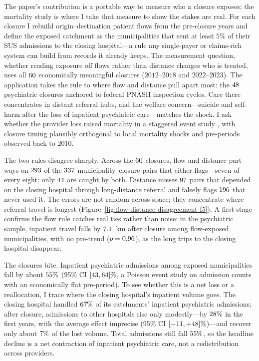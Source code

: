 The paper's contribution is a portable way to measure who a closure
exposes; the mortality study is where I take that measure to show the
stakes are real. For each closure I rebuild origin--destination patient
flows from the pre-closure years and define the exposed catchment as the
municipalities that sent at least $5\%$ of their SUS admissions to the
closing hospital---a rule any single-payer or claims-rich system can build
from records it already keeps. The measurement question, whether reading
exposure off flows rather than distance changes who is treated, uses all
$60$ economically meaningful closures ($2012$--$2018$ and
$2022$--$2023$). The application takes the rule to where flow and distance pull apart most:
the $48$ psychiatric closures anchored to federal PNASH
inspection cycles. Care there concentrates in distant referral hubs, and
the welfare concern---suicide and self-harm after the loss of inpatient
psychiatric care---matches the shock. I ask whether the provider loss
raised mortality in a staggered event study \citep{sunAbraham2021}, with
closure timing plausibly orthogonal to local mortality shocks and
pre-periods observed back to $2010$.

The two rules disagree sharply. Across the $60$ closures,
flow and distance part ways on $293$ of the $337$
municipality--closure pairs that either flags---seven of every eight; only
$44$ are caught by both. Distance misses $97$ pairs that depended on the closing
hospital through long-distance referral and falsely flags $196$
that never used it. The errors are not random across space; they
concentrate where referral travel is longest
(Figure~\ref{fig:flow-distance-disagreement-f5}). A first stage confirms
the flow rule catches real ties rather than noise: in the psychiatric
sample, inpatient travel falls by $7.1$~km after closure among
flow-exposed municipalities, with no pre-trend ($p = 0.96$), as
the long trips to the closing hospital disappear.

The closures bite. Inpatient psychiatric admissions among exposed
municipalities fall by about $55\%$ (95\% CI
$[43, 64]\%$, a Poisson event study on admission
counts with an economically flat pre-period). To see whether this is a net
loss or a reallocation, I trace where the closing hospital's inpatient volume
goes. The closing hospital handled $67\%$ of its catchments'
inpatient psychiatric admissions; after closure, admissions to other hospitals
rise only modestly---by $28\%$ in the first years, with the
average effect imprecise (95\% CI $[-11, +48]\%$)---and
recover only about $7\%$ of the lost volume. Total admissions still
fall $55\%$, so the headline decline is a net contraction of
inpatient psychiatric care, not a redistribution across providers.

